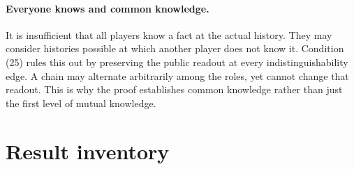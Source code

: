 \paragraph{Everyone knows and common knowledge.}
It is insufficient that all players know a fact at the actual history. They
may consider histories possible at which another player does not know it.
Condition (25) rules this out by preserving the public readout at every
indistinguishability edge. A chain may alternate arbitrarily among the roles,
yet cannot change that readout. This is why the proof establishes common
knowledge rather than just the first level of mutual knowledge.

\section{Result inventory}

